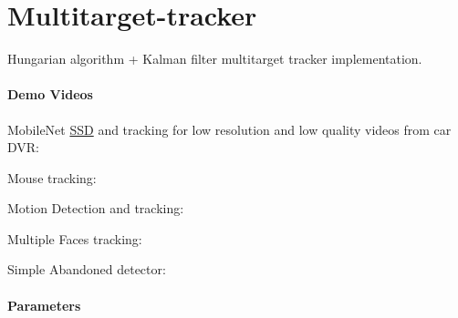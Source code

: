 

\section*{Multitarget-\/tracker}

Hungarian algorithm + Kalman filter multitarget tracker implementation.

\paragraph*{Demo Videos}


\begin{DoxyItemize}
\item Mobile\+Net \mbox{\hyperlink{class_s_s_d}{S\+SD}} and tracking for low resolution and low quality videos from car D\+VR\+:
\end{DoxyItemize}

\href{https://youtu.be/Qssz6tVGoOc}{\tt }


\begin{DoxyItemize}
\item Mouse tracking\+:
\end{DoxyItemize}

\href{https://www.youtube.com/watch?v=2fW5TmAtAXM}{\tt }


\begin{DoxyItemize}
\item Motion Detection and tracking\+:
\end{DoxyItemize}

\href{https://www.youtube.com/watch?v=GjN8jOy4kVw}{\tt }


\begin{DoxyItemize}
\item Multiple Faces tracking\+:
\end{DoxyItemize}

\href{https://www.youtube.com/watch?v=j67CFwFtciU}{\tt }


\begin{DoxyItemize}
\item Simple Abandoned detector\+:
\end{DoxyItemize}

\href{https://www.youtube.com/watch?v=fpkHRsFzspA}{\tt }

\paragraph*{Parameters}



